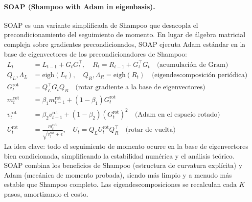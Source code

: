 \paragraph{SOAP (Shampoo with Adam in eigenbasis).}
SOAP es una variante simplificada de Shampoo que desacopla el precondicionamiento del seguimiento de momento. En lugar de álgebra matricial compleja sobre gradientes precondicionados, SOAP ejecuta Adam estándar en la base de eigenvectores de los precondicionadores de Shampoo:
\begin{align}
L_t &= L_{t-1} + G_t G_t^\top, \quad R_t = R_{t-1} + G_t^\top G_t \quad\text{(acumulación de Gram)} \\
Q_L, \Lambda_L &= \text{eigh}(L_t), \quad Q_R, \Lambda_R = \text{eigh}(R_t) \quad\text{(eigendescomposición periódica)} \\
G_t^{\text{rot}} &= Q_L^\top G_t Q_R \quad\text{(rotar gradiente a la base de eigenvectores)} \\
m_t^{\text{rot}} &= \beta_1 m_{t-1}^{\text{rot}} + (1-\beta_1) G_t^{\text{rot}} \\
v_t^{\text{rot}} &= \beta_2 v_{t-1}^{\text{rot}} + (1-\beta_2)(G_t^{\text{rot}})^2 \quad\text{(Adam en el espacio rotado)} \\
U_t^{\text{rot}} &= \frac{m_t^{\text{rot}}}{\sqrt{v_t^{\text{rot}}}+\epsilon}, \quad U_t = Q_L U_t^{\text{rot}} Q_R^\top \quad\text{(rotar de vuelta)}
\end{align}
La idea clave: todo el seguimiento de momento ocurre en la base de eigenvectores bien condicionada, simplificando la estabilidad numérica y el análisis teórico. SOAP combina los beneficios de Shampoo (estructura de curvatura explícita) y Adam (mecánica de momento probada), siendo más limpio y a menudo más estable que Shampoo completo. Las eigendescomposiciones se recalculan cada $K$ pasos, amortizando el costo.

